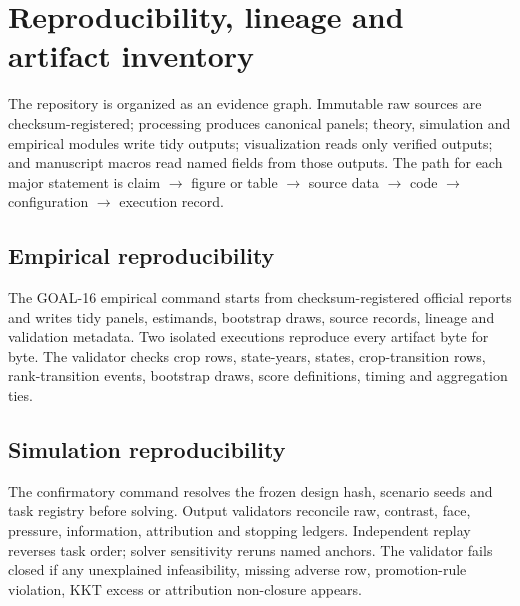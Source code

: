 \section{Reproducibility, lineage and artifact inventory}

The repository is organized as an evidence graph. Immutable raw sources are checksum-registered; processing produces canonical panels; theory, simulation and empirical modules write tidy outputs; visualization reads only verified outputs; and manuscript macros read named fields from those outputs. The path for each major statement is claim $\rightarrow$ figure or table $\rightarrow$ source data $\rightarrow$ code $\rightarrow$ configuration $\rightarrow$ execution record.

\subsection{Empirical reproducibility}
The GOAL-16 empirical command starts from checksum-registered official reports and writes tidy panels, estimands, bootstrap draws, source records, lineage and validation metadata. Two isolated executions reproduce every artifact byte for byte. The validator checks \NCropRows{} crop rows, \NStateYears{} state-years, \NStates{} states, \CropTransitionRows{} crop-transition rows, \TransitionEvents{} rank-transition events, \BootstrapReplications{} bootstrap draws, score definitions, timing and aggregation ties.

\subsection{Simulation reproducibility}
The confirmatory command resolves the frozen design hash, scenario seeds and task registry before solving. Output validators reconcile raw, contrast, face, pressure, information, attribution and stopping ledgers. Independent replay reverses task order; solver sensitivity reruns named anchors. The validator fails closed if any unexplained infeasibility, missing adverse row, promotion-rule violation, KKT excess or attribution non-closure appears.

